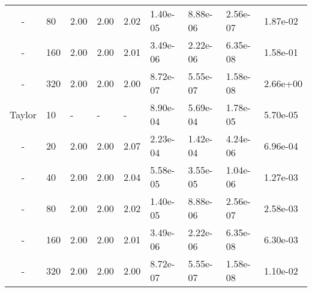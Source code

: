 \begin{table}[htbp]
{\begin{tabular}{cllllllll}
   - &    80 & 2.00 & 2.00 & 2.02 & 1.40e-05 & 8.88e-06 & 2.56e-07 & 1.87e-02 \\ 
   - &   160 & 2.00 & 2.00 & 2.01 & 3.49e-06 & 2.22e-06 & 6.35e-08 & 1.58e-01 \\ 
   - &   320 & 2.00 & 2.00 & 2.00 & 8.72e-07 & 5.55e-07 & 1.58e-08 & 2.66e+00 \\
   \hline
   Taylor &  10 & - & - & - & 8.90e-04 & 5.69e-04 & 1.78e-05 & 5.70e-05 \\ 
   - &   20 & 2.00 & 2.00 & 2.07 & 2.23e-04 & 1.42e-04 & 4.24e-06 & 6.96e-04 \\ 
   - &   40 & 2.00 & 2.00 & 2.04 & 5.58e-05 & 3.55e-05 & 1.04e-06 & 1.27e-03 \\ 
   - &   80 & 2.00 & 2.00 & 2.02 & 1.40e-05 & 8.88e-06 & 2.56e-07 & 2.58e-03 \\ 
   - &  160 & 2.00 & 2.00 & 2.01 & 3.49e-06 & 2.22e-06 & 6.35e-08 & 6.30e-03 \\ 
   - &  320 & 2.00 & 2.00 & 2.00 & 8.72e-07 & 5.55e-07 & 1.58e-08 & 1.10e-02 \\
   \hline
   \end{tabular}
   }
\end{table}

